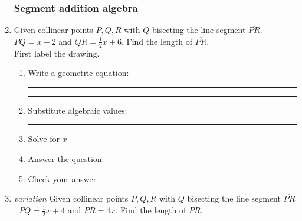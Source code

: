 \documentclass[12pt, oneside]{article}
\begin{document}
\begin{enumerate}
\subsubsection*{Segment addition algebra}
  \item Given collinear points $P, Q, R$ with $Q$ bisecting the line segment $\overline{PR}$. $PQ=x-2$ and $QR = \frac{1}{2} x+6$. Find the length of $\overline{PR}$.\\ \bigskip
    First label the drawing.
    \begin{flushright}
    \end{flushright}
    \begin{enumerate}
      \item Write a geometric equation: \rule{4cm}{0.15mm} \hspace{1cm} \rule{4cm}{0.15mm}
      \item Substitute algebraic values: \rule{4cm}{0.15mm}
      \item Solve for $x$
      \item Answer the question:
      \item Check your answer
    \end{enumerate}

    \item \emph{variation} Given collinear points $P, Q, R$ with $Q$ bisecting the line segment $\overline{PR}$. $PQ=\frac{1}{2} x+4$ and $PR = 4x$. Find the length of $\overline{PR}$.



  \end{enumerate}
\end{document}
